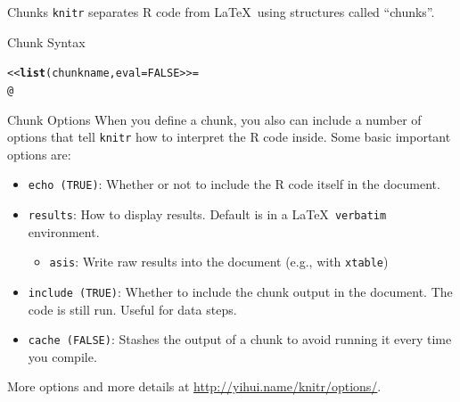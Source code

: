 \documentclass{beamer}\usepackage[]{graphicx}\usepackage[]{color}
\makeatletter
\newcommand{\hlnum}[1]{\textcolor[rgb]{0.686,0.059,0.569}{#1}}%
\newcommand{\hlstd}[1]{\textcolor[rgb]{0.345,0.345,0.345}{#1}}%
\newcommand{\hlkwc}[1]{\textcolor[rgb]{0.333,0.667,0.333}{#1}}%
\newcommand{\hlkwd}[1]{\textcolor[rgb]{0.737,0.353,0.396}{\textbf{#1}}}%
\newenvironment{kframe}{%
 \def\at@end@of@kframe{}%
 \ifinner\ifhmode%
  \def\at@end@of@kframe{\end{minipage}}%
  \begin{minipage}{\columnwidth}%
 \fi\fi%
 \def\FrameCommand##1{\hskip\@totalleftmargin \hskip-\fboxsep
 \colorbox{shadecolor}{##1}\hskip-\fboxsep
     \hskip-\linewidth \hskip-\@totalleftmargin \hskip\columnwidth}%
 \MakeFramed {\advance\hsize-\width
   \@totalleftmargin\z@ \linewidth\hsize
   \@setminipage}}%
 {\par\unskip\endMakeFramed%
 \at@end@of@kframe}
\newenvironment{knitrout}{}{} %
\makeatother
\begin{document}
	\begin{frame}{Chunks}
		\texttt{knitr} separates R code from \LaTeX \ using structures called ``chunks''.
		\begin{block}{Chunk Syntax}
\begin{knitrout}
\color{fgcolor}\begin{kframe}
\begin{alltt}
<<\hlkwd{list}\hlstd{(chunkname,} \hlkwc{eval}\hlstd{=}\hlnum{FALSE}>>=
@
\end{alltt}
\end{kframe}


\end{knitrout}
		\end{block}
	\end{frame}
	
		\begin{frame}{Chunk Options}
		When you define a chunk, you also can include a number of options that tell \texttt{knitr} how to interpret the R code inside. Some basic important options are:
		\begin{itemize}
			\item \texttt{echo (TRUE)}: Whether or not to include the R code itself in the document.
			\item \texttt{results}: How to display results. Default is in a \LaTeX \ \texttt{verbatim} environment.
			\begin{itemize}
				\item \texttt{asis}: Write raw results into the document (e.g., with \texttt{xtable})
			\end{itemize}
			\item \texttt{include (TRUE)}: Whether to include the chunk output in the document. The code is still run. Useful for data steps.
			\item \texttt{cache (FALSE)}: Stashes the output of a chunk to avoid running it every time you compile.
		\end{itemize}
		\footnotesize{More options and more details at \url{http://yihui.name/knitr/options/}.}
	\end{frame}
	
\end{document}
